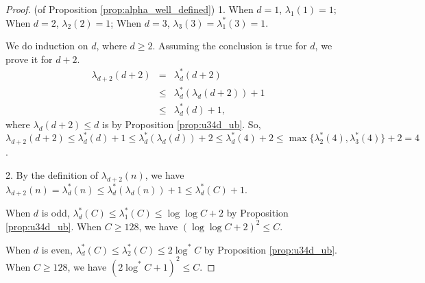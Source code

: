 \documentclass[11pt]{article}
\begin{document}
\begin{proof} (of Proposition \ref{prop:alpha_well_defined})
1. When $d = 1$, $\lambda_1(1) = 1$; When $d = 2$, $\lambda_2(2) = 1$; When $d = 3$, $\lambda_3(3) = \lambda_1^*(3) = 1$.

We do induction on $d$, where $d \ge 2$. Assuming the conclusion is true for $d$, we prove it for $d + 2$.
\begin{eqnarray*}
\lambda_{d+2}(d+2) & = & \lambda_d^*(d+2) \\
& \le & \lambda_d^*(\lambda_d(d+2)) + 1 \\
& \le & \lambda_d^*(d) + 1,
\end{eqnarray*}
where $\lambda_d(d+2) \le d$ is by Proposition \ref{prop:u34d_ub}. So, $\lambda_{d+2}(d+2) \le  \lambda_d^*(d) + 1 \le \lambda_d^*(\lambda_d(d)) + 2 \le  \lambda^*_d(4) + 2 \le \max\{\lambda_2^*(4), \lambda_3^*(4)\} + 2 = 4$.

2. By the definition of $\lambda_{d+2}(n)$, we have $\lambda_{d+2}(n) = \lambda_d^*(n) \le \lambda_d^*(\lambda_d(n)) + 1 \le \lambda_d^*(C) + 1$.

When $d$ is odd, $\lambda_d^*(C) \le \lambda_1^*(C) \le \log\log C + 2$ by Proposition \ref{prop:u34d_ub}. When $C \ge 128$, we have $(\log\log C + 2)^2 \le C$.

When $d$ is even, $\lambda_d^*(C) \le \lambda_2^*(C) \le 2\log^* C$ by Proposition \ref{prop:u34d_ub}. When $C \ge 128$, we have $(2\log^* C + 1)^2 \le C$.
\end{proof}

\printbibliography
\end{document}
